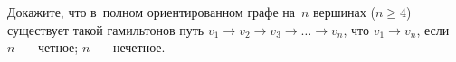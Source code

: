 \begin{problems}
\item
Докажите, что в~полном ориентированном графе на~$n$ вершинах ($n \geq 4$)
существует такой гамильтонов путь $v_1 \to v_2 \to v_3 \to \ldots \to v_{n}$,
что $v_{1} \to v_{n}$, если
\\
\subproblem $n$~--- четное;
\qquad
\subproblem $n$~--- нечетное.



\end{problems}

